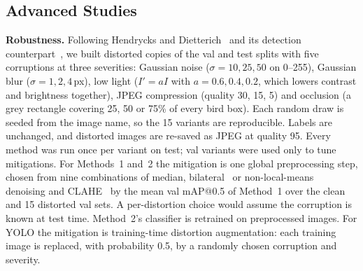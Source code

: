 
\subsection{Advanced Studies}
\label{sec:advanced}

\textbf{Robustness.} Following Hendrycks and Dietterich~\cite{hendrycks2019benchmarking} and its
detection counterpart~\cite{michaelis2019benchmarking}, we built distorted copies of the val and
test splits with five corruptions at three severities: Gaussian noise ($\sigma=10,25,50$ on
0--255), Gaussian blur ($\sigma=1,2,4$\,px), low light ($I'=aI$ with $a=0.6,0.4,0.2$,
which lowers contrast and brightness together), JPEG compression (quality 30, 15, 5) and
occlusion (a grey rectangle covering 25, 50 or 75\% of every bird box). Each random draw is
seeded from the image name, so the 15 variants are reproducible. Labels are unchanged, and
distorted images are re-saved as JPEG at quality 95. Every
method was run once per variant on test; val variants were used only to tune mitigations.
For Methods~1 and~2 the mitigation is one global preprocessing step, chosen from nine
combinations of median, bilateral~\cite{tomasi1998bilateral} or non-local-means~\cite{buades2005nonlocal}
denoising and CLAHE~\cite{zuiderveld1994clahe} by the mean val mAP@0.5 of Method~1 over the
clean and 15 distorted val sets. A per-distortion choice would assume the corruption is known
at test time. Method~2's classifier is retrained on preprocessed images. For YOLO the mitigation
is training-time distortion augmentation: each training image is replaced, with probability 0.5,
by a randomly chosen corruption and severity.

